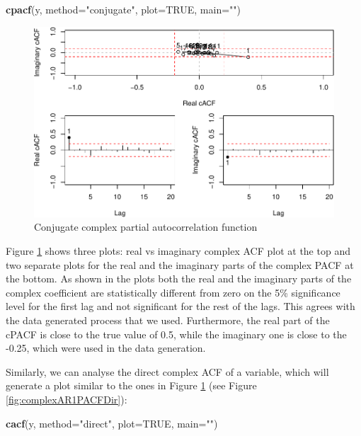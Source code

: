 \documentclass[
]{book}
\newenvironment{Shaded}{\begin{snugshade}}{\end{snugshade}}
\newcommand{\DataTypeTok}[1]{\textcolor[rgb]{0.13,0.29,0.53}{#1}}
\newcommand{\KeywordTok}[1]{\textcolor[rgb]{0.13,0.29,0.53}{\textbf{#1}}}
\newcommand{\NormalTok}[1]{#1}
\newcommand{\OtherTok}[1]{\textcolor[rgb]{0.56,0.35,0.01}{#1}}
\newcommand{\StringTok}[1]{\textcolor[rgb]{0.31,0.60,0.02}{#1}}
\begin{document}
\begin{Shaded}
\begin{Highlighting}[]
\KeywordTok{cpacf}\NormalTok{(y, }\DataTypeTok{method=}\StringTok{"conjugate"}\NormalTok{, }\DataTypeTok{plot=}\OtherTok{TRUE}\NormalTok{, }\DataTypeTok{main=}\StringTok{""}\NormalTok{)}
\end{Highlighting}
\end{Shaded}

\begin{figure}
\centering
\includegraphics{Svetunkov---Svetunkov---Complex-Valued-Econometrics_files/figure-latex/complexAR1PACFConj-1.pdf}
\caption{\label{fig:complexAR1PACFConj}Conjugate complex partial autocorrelation function}
\end{figure}

Figure \ref{fig:complexAR1PACFConj} shows three plots: real vs imaginary complex ACF plot at the top and two separate plots for the real and the imaginary parts of the complex PACF at the bottom. As shown in the plots both the real and the imaginary parts of the complex coefficient are statistically different from zero on the 5\% significance level for the first lag and not significant for the rest of the lags. This agrees with the data generated process that we used. Furthermore, the real part of the cPACF is close to the true value of 0.5, while the imaginary one is close to the -0.25, which were used in the data generation.

Similarly, we can analyse the direct complex ACF of a variable, which will generate a plot similar to the ones in Figure \ref{fig:complexAR1PACFConj} (see Figure \ref{fig:complexAR1PACFDir}):

\begin{Shaded}
\begin{Highlighting}[]
\KeywordTok{cacf}\NormalTok{(y, }\DataTypeTok{method=}\StringTok{"direct"}\NormalTok{, }\DataTypeTok{plot=}\OtherTok{TRUE}\NormalTok{, }\DataTypeTok{main=}\StringTok{""}\NormalTok{)}
\end{Highlighting}
\end{Shaded}
\end{document}
